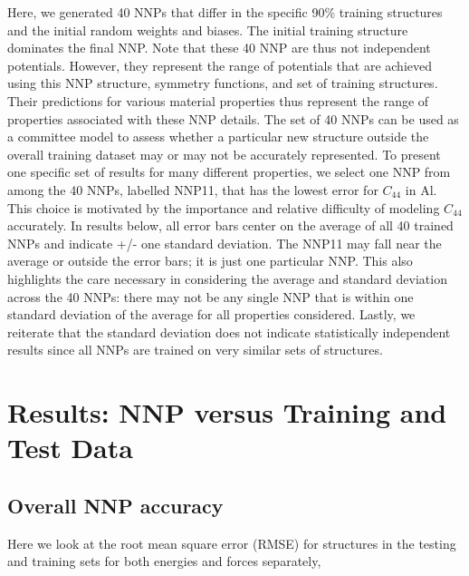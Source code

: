 \documentclass{article}
\begin{document}
Here, we generated 40 NNPs that differ in the specific 90\% training structures and the initial random weights and biases.  The initial training structure dominates the final NNP.  Note that these 40 NNP are thus not independent potentials.  However, they represent the range of potentials that are achieved using this NNP structure, symmetry functions, and set of training structures.  Their predictions for various material properties thus represent the range of properties associated with these NNP details.  The set of 40 NNPs can be used as a committee model to assess whether a particular new structure outside the overall training dataset may or may not be accurately represented.  To present one specific set of results for many different properties, we select one NNP from among the 40 NNPs, labelled NNP11, that has the lowest error for $C_{44}$ in Al. This choice is motivated by the importance and relative difficulty of modeling $C_{44}$ accurately.  In results below, all error bars center on the average of all 40 trained NNPs and indicate +/- one standard deviation.  The NNP11 may fall near the average or outside the error bars; it is just one particular NNP.  This also highlights the care necessary in considering the average and standard deviation across the 40 NNPs: there may not be any single NNP that is within one standard deviation of the average for all properties considered.  Lastly, we reiterate that the standard deviation does not indicate statistically independent results since all NNPs are trained on very similar sets of structures.

\section{Results: NNP versus Training and Test Data}

\subsection{Overall NNP accuracy} \label{sct:test_and_train_errors}
Here we look at the root mean square error (RMSE) for structures in the testing and training sets for both energies and forces separately,
\end{document}
